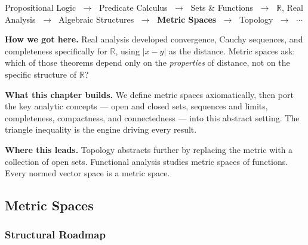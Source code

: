 \begin{tcolorbox}[
  colback=gray!6,
  colframe=gray!40,
  arc=2pt,
  left=8pt, right=8pt, top=6pt, bottom=6pt,
  title={\small\textbf{Where You Are in the Journey}},
  fonttitle=\small\bfseries
]
\begin{center}
\small
Propositional Logic
$\;\to\;$ Predicate Calculus
$\;\to\;$ Sets \& Functions
$\;\to\;$ $\mathbb{R}$, Real Analysis
$\;\to\;$ Algebraic Structures
$\;\to\;$ \textbf{Metric Spaces}
$\;\to\;$ Topology
$\;\to\;$ $\cdots$
\end{center}

\medskip
\noindent\textbf{How we got here.}
Real analysis developed convergence, Cauchy sequences, and completeness
specifically for $\mathbb{R}$, using $|x - y|$ as the distance.
Metric spaces ask: which of those theorems depend only on
the \emph{properties} of distance, not on the specific structure of $\mathbb{R}$?

\medskip
\noindent\textbf{What this chapter builds.}
We define metric spaces axiomatically, then port the key analytic
concepts --- open and closed sets, sequences and limits, completeness,
compactness, and connectedness --- into this abstract setting.
The triangle inequality is the engine driving every result.

\medskip
\noindent\textbf{Where this leads.}
Topology abstracts further by replacing the metric with a collection
of open sets. Functional analysis studies metric spaces of functions.
Every normed vector space is a metric space.
\end{tcolorbox}
\vspace{1em}


\subsection{Metric Spaces}

\subsubsection*{Structural Roadmap}

